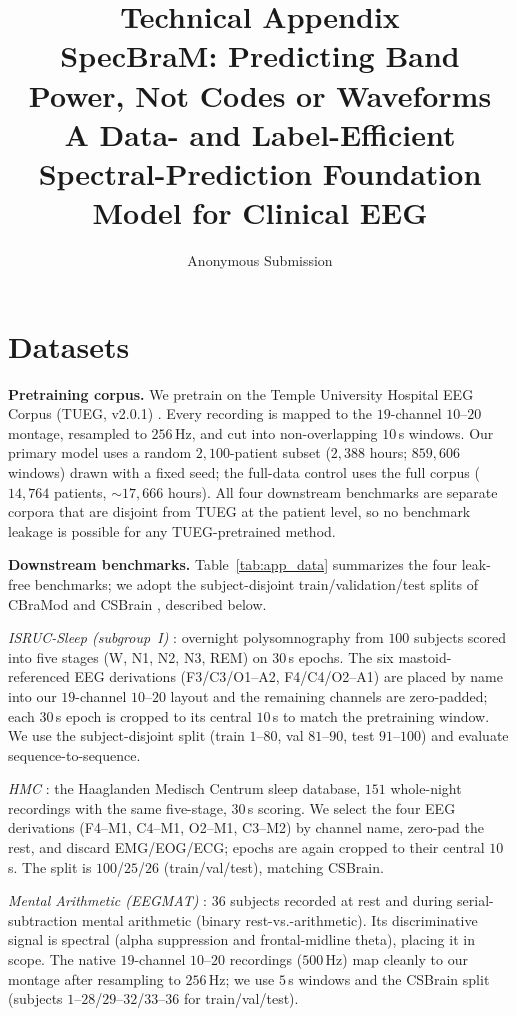 \documentclass[letterpaper]{article}
\title{Technical Appendix\\SpecBraM: Predicting Band Power, Not Codes or Waveforms\\A Data- and
Label-Efficient Spectral-Prediction Foundation Model for Clinical EEG}
\author{Anonymous Submission}
\begin{document}
\maketitle
\appendix

\section{Datasets}\label{app:datasets}
\noindent\textbf{Pretraining corpus.} We pretrain on the Temple University Hospital
EEG Corpus (TUEG, v2.0.1) \cite{obeid2016tuh}. Every recording is mapped to the
$19$-channel $10$--$20$ montage, resampled to $256$\,Hz, and cut into
non-overlapping $10$\,s windows. Our primary model uses a random $2{,}100$-patient
subset ($2{,}388$ hours; $859{,}606$ windows) drawn with a fixed seed; the
full-data control uses the full corpus ($14{,}764$ patients,
$\sim17{,}666$ hours). All four downstream benchmarks are separate corpora that are
disjoint from TUEG at the patient level, so no benchmark leakage is possible for any
TUEG-pretrained method.

\noindent\textbf{Downstream benchmarks.} Table~\ref{tab:app_data} summarizes the
four leak-free benchmarks; we adopt the subject-disjoint train/validation/test
splits of CBraMod \cite{wang2025cbramod} and CSBrain \cite{csbrain}, described below.

\noindent\emph{ISRUC-Sleep (subgroup~I)} \cite{khalighi2016isruc}: overnight
polysomnography from $100$ subjects scored into five stages (W, N1, N2, N3, REM) on
$30$\,s epochs. The six mastoid-referenced EEG derivations (F3/C3/O1--A2,
F4/C4/O2--A1) are placed by name into our $19$-channel $10$--$20$ layout and the
remaining channels are zero-padded; each $30$\,s epoch is cropped to its central
$10$\,s to match the pretraining window. We use the subject-disjoint split
(train $1$--$80$, val $81$--$90$, test $91$--$100$) and evaluate
sequence-to-sequence.

\noindent\emph{HMC} \cite{alvarez2021hmc}: the Haaglanden Medisch Centrum sleep
database, $151$ whole-night recordings with the same five-stage, $30$\,s scoring. We
select the four EEG derivations (F4--M1, C4--M1, O2--M1, C3--M2) by channel name,
zero-pad the rest, and discard EMG/EOG/ECG; epochs are again cropped to their
central $10$\,s. The split is $100$/$25$/$26$ (train/val/test), matching CSBrain.


\noindent\emph{Mental Arithmetic (EEGMAT)} \cite{zyma2019mentalarith}: $36$ subjects
recorded at rest and during serial-subtraction mental arithmetic (binary
rest-vs.-arithmetic). Its discriminative signal is spectral (alpha suppression and
frontal-midline theta), placing it in scope. The native $19$-channel $10$--$20$
recordings ($500$\,Hz) map cleanly to our montage after resampling to $256$\,Hz; we
use $5$\,s windows and the CSBrain split (subjects $1$--$28$/$29$--$32$/$33$--$36$
for train/val/test).
\end{document}
